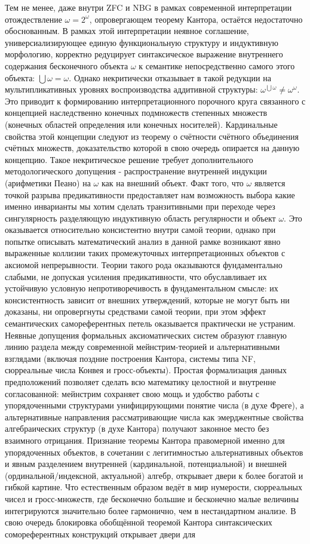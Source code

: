 \documentclass[12pt]{article}
\begin{document}
Тем не менее, даже внутри ZFC и NBG в рамках современной интерпретации отождествление $\omega = 2^\omega$, опровергающем теорему Кантора, остаётся недостаточно обоснованным. В рамках этой интерпретации неявное соглашение, универсиализирующее единую функциональную структуру и индуктивную морфологию, корректно редуцирует синтаксическое выражение внутреннего содержания бесконечного объекта $\omega$ к семантике непосредственно самого этого объекта: $\bigcup \omega = \omega$. Однако некритически отказывает в такой редукции на мультипликативных уровнях воспроизводства аддитивной структуры: $\omega^{\bigcup \omega} \neq \omega^{\omega}$. Это приводит к формированию интерпретационного порочного круга связанного с концепцией наследственно конечных подмножеств степенных множеств (конечных областей определения или конечных носителей). Кардинальные свойства этой концепции следуют из теорему о счётности счётного объединения счётных множеств, доказательство которой в свою очередь опирается на данную концепцию. Такое некритическое решение требует дополнительного методологического допущения - распространение внутренней индукции (арифметики Пеано) на $\omega$ как на внешний объект. Факт того, что $\omega$ является точкой разрыва предикативности предоставляет нам возможность выбора какие именно инварианты мы хотим сделать транзитивными при переходе через сингулярность разделяющую индуктивную область регулярности и объект $\omega$. Это оказывается относительно консистентно внутри самой теории, однако при попытке описывать математический анализ в данной рамке возникают явно выраженные коллизии таких промежуточных интерпретационных объектов с аксиомой непрерывности. Теории такого рода оказываются фундаментально слабыми, не допуская усиления предикативности, что обуславливает их устойчивую условную непротиворечивость в фундаментальном смысле: их консистентность зависит от внешних утверждений, которые не могут быть ни доказаны, ни опровергнуты средствами самой теории, при этом эффект семантических самореферентных петель оказывается практически не устраним. Неявные допущения формальных аксиоматических систем образуют главную линию раздела между современной мейнстрим-теорией и альтернативными взглядами (включая поздние построения Кантора, системы типа NF, сюрреальные числа Конвея и гросс-объекты). Простая формализация данных предположений позволяет сделать всю математику целостной и внутренне согласованной: мейнстрим сохраняет свою мощь и удобство работы с упорядоченными структурами унифицирующими понятие числа (в духе Фреге), а альтернативные направления рассматривающие числа как эмерджентные свойства алгебраических структур (в духе Кантора) получают законное место без взаимного отрицания. Признание теоремы Кантора правомерной именно для упорядоченных объектов, в сочетании с легитимностью альтернативных объектов и явным разделением внутренней (кардинальной, потенциальной) и внешней (ординальной/индексной, актуальной) алгебр, открывает двери к более богатой и гибкой картине. Что естественным образом ведёт в мир нумерости, сюрреальных чисел и гросс-множеств, где бесконечно большие и бесконечно малые величины интегрируются значительно более гармонично, чем в нестандартном анализе. В свою очередь блокировка обобщённой теоремой Кантора синтаксических сомореферентных конструкций открывает двери для 
\end{document}
